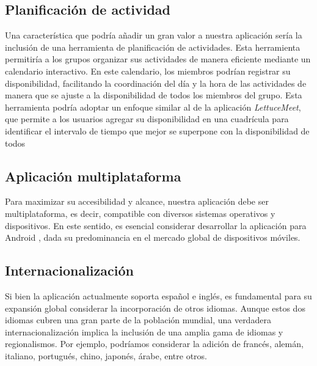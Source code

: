         \subsection{Planificación de actividad}
            Una característica que podría añadir un gran valor a nuestra aplicación sería la inclusión de una herramienta de planificación de actividades. Esta herramienta permitiría a los grupos organizar sus actividades de manera eficiente mediante un calendario interactivo. En este calendario, los miembros podrían registrar su disponibilidad, facilitando la coordinación del día y la hora de las actividades de manera que se ajuste a la disponibilidad de todos los miembros del grupo.
            Esta herramienta podría adoptar un enfoque similar al de la aplicación \textit{LettuceMeet}\cite{REF7}, que permite a los usuarios agregar su disponibilidad en una cuadrícula para identificar el intervalo de tiempo que mejor se superpone con la disponibilidad de todos

        \subsection{Aplicación multiplataforma}
            Para maximizar su accesibilidad y alcance, nuestra aplicación debe ser multiplataforma, es decir, compatible con diversos sistemas operativos y dispositivos. En este sentido, es esencial considerar desarrollar la aplicación para Android , dada su predominancia en el mercado global de dispositivos móviles.


        \subsection{Internacionalización}
            Si bien la aplicación actualmente soporta español e inglés, es fundamental para su expansión global considerar la incorporación de otros idiomas. Aunque estos dos idiomas cubren una gran parte de la población mundial, una verdadera internacionalización implica la inclusión de una amplia gama de idiomas y regionalismos. Por ejemplo, podríamos considerar la adición de francés, alemán, italiano, portugués, chino, japonés, árabe, entre otros.
